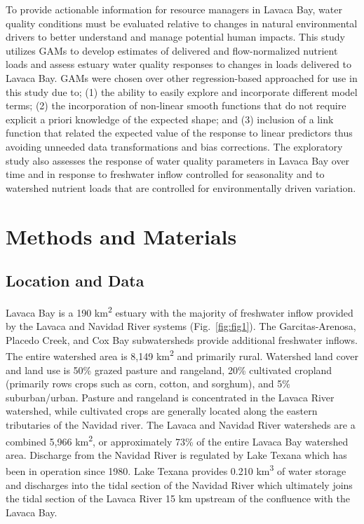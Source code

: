 \documentclass[fleqn,10pt,lineno]{wlpeerj} %
\begin{document}
To provide actionable information for resource managers in Lavaca Bay,
water quality conditions must be evaluated relative to changes in
natural environmental drivers to better understand and manage potential
human impacts. This study utilizes GAMs to develop estimates of
delivered and flow-normalized nutrient loads and assess estuary water
quality responses to changes in loads delivered to Lavaca Bay. GAMs were
chosen over other regression-based approached for use in this study due
to; (1) the ability to easily explore and incorporate different model
terms; (2) the incorporation of non-linear smooth functions that do not
require explicit a priori knowledge of the expected shape; and (3)
inclusion of a link function that related the expected value of the
response to linear predictors thus avoiding unneeded data
transformations and bias corrections. The exploratory study also
assesses the response of water quality parameters in Lavaca Bay over
time and in response to freshwater inflow controlled for seasonality and
to watershed nutrient loads that are controlled for environmentally
driven variation.

\hypertarget{methods-and-materials}{%
\section*{Methods and Materials}\label{methods-and-materials}}

\hypertarget{location-and-data}{%
\subsection*{Location and Data}\label{location-and-data}}

Lavaca Bay is a 190 km\textsuperscript{2} estuary with the majority of
freshwater inflow provided by the Lavaca and Navidad River systems
(Fig.~\ref{fig:fig1}). The Garcitas-Arenosa, Placedo Creek, and Cox Bay
subwatersheds provide additional freshwater inflows. The entire
watershed area is 8,149 km\textsuperscript{2} and primarily rural.
Watershed land cover and land use is 50\% grazed pasture and rangeland,
20\% cultivated cropland (primarily rows crops such as corn, cotton, and
sorghum), and 5\% suburban/urban. Pasture and rangeland is concentrated
in the Lavaca River watershed, while cultivated crops are generally
located along the eastern tributaries of the Navidad river. The Lavaca
and Navidad River watersheds are a combined 5,966 km\textsuperscript{2},
or approximately 73\% of the entire Lavaca Bay watershed area. Discharge
from the Navidad River is regulated by Lake Texana which has been in
operation since 1980. Lake Texana provides 0.210 km\textsuperscript{3}
of water storage and discharges into the tidal section of the Navidad
River which ultimately joins the tidal section of the Lavaca River 15 km
upstream of the confluence with the Lavaca Bay.
\end{document}
